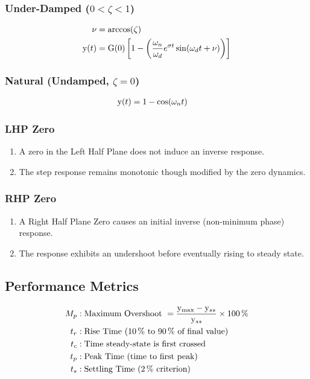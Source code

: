 \subsubsection*{Under-Damped (\(0 < \zeta < 1\))}
\begin{align*}
    \nu &= \arccos{\zeta} \\
    \func{y}[t] &= \func{G}[0]\left[ 1 - \left( \frac{\omega_n}{\omega_d} e^{\sigma t} \sin{\omega_d t + \nu} \right) \right] \\
\end{align*}

\subsubsection*{Natural (Undamped, \(\zeta = 0\))}
\begin{align*}
    \func{y}[t] &= 1 - \cos{\omega_n t}
\end{align*}

\subsubsection*{LHP Zero}
\begin{enumerate}
    \item A zero in the Left Half Plane does not induce an inverse response.
    \item The step response remains monotonic though modified by the zero dynamics.
\end{enumerate}

\subsubsection*{RHP Zero}
\begin{enumerate}
    \item A Right Half Plane Zero causes an initial inverse (non-minimum phase) response.
    \item The response exhibits an undershoot before eventually rising to steady state.
\end{enumerate}

\subsection*{Performance Metrics}
\begin{align*}
    M_p &: \text{Maximum Overshoot } = \frac{\func{y}_{\max}-\func{y}_{ss}}{\func{y}_{ss}} \times \qty{100}{\percent} \\
    t_r &: \text{Rise Time (\qty{10}{\percent} to \qty{90}{\percent} of final value)} \\
    t_c &: \text{Time steady-state is first crossed} \\
    t_p &: \text{Peak Time (time to first peak)} \\
    t_s &: \text{Settling Time (\qty{2}{\percent} criterion)}
\end{align*}

